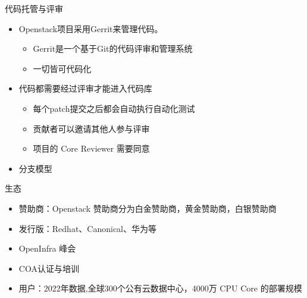 \documentclass{beamer}
\begin{document}
\begin{frame}[label={sec:org529bf66}]{代码托管与评审}
\begin{itemize}
\item Openstack项目采用Gerrit来管理代码。
\begin{itemize}
\item Gerrit是一个基于Git的代码评审和管理系统
\item 一切皆可代码化
\end{itemize}
\item 代码都需要经过评审才能进入代码库
\begin{itemize}
\item 每个patch提交之后都会自动执行自动化测试
\item 贡献者可以邀请其他人参与评审
\item 项目的 Core Reviewer 需要同意
\end{itemize}
\item 分支模型
\end{itemize}
\end{frame}

\begin{frame}[label={sec:org1e63c5a}]{生态}
\begin{itemize}
\item 赞助商：Openstack 赞助商分为白金赞助商，黄金赞助商，白银赞助商
\item 发行版：Redhat、Canonical、华为等
\item OpenInfra 峰会
\item COA认证与培训
\item 用户：2022年数据,全球300个公有云数据中心，4000万 CPU Core 的部署规模
\end{itemize}
\end{frame}
\end{document}
